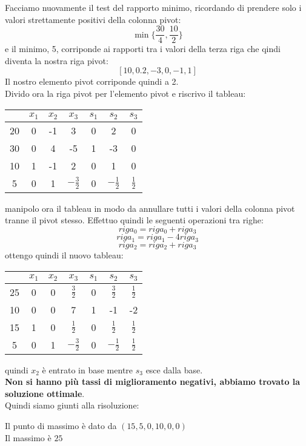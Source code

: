 \documentclass[a4paper,12pt, oneside]{book}
\begin{document}
Facciamo nuovamente il test del rapporto minimo, ricordando di
prendere solo i valori strettamente positivi della colonna pivot:
\[\min\Bigg\{\frac{30}{4}, \frac{10}{2}\Bigg\}\]
e il minimo, 5, corriponde ai rapporti tra i valori della terza riga
che qindi diventa la nostra riga pivot:
\[[10,0.2,-3,0,-1,1]\]
Il nostro elemento pivot corriponde quindi a 2.\\
Divido ora la riga pivot per l’elemento pivot e riscrivo il tableau:
\begin{center}
  \begin{tabular}{c|cccccc}
    & $x_1$ & $x_2$ & $x_3$ & $s_1$ & $s_2$ & $s_3$\\
    \hline
    20 & 0 & -1 & 3 & 0 & 2 & 0\\
    \hline
    30 & 0 & 4 & -5 & 1 & -3 & 0\\
    10 & 1 & -1 & 2 & 0 & 1 & 0\\
    5 & 0 & 1 & $-\frac{3}{2}$ & 0 & $-\frac{1}{2}$ & $\frac{1}{2}$
  \end{tabular}
\end{center}
manipolo ora il tableau in modo da annullare tutti i valori della colonna pivot
tranne il pivot stesso. Effettuo quindi le seguenti operazioni tra
righe:
\[riga_0=riga_0+riga_3\]
\[riga_1=riga_1-4riga_3\]
\[riga_2=riga_2+riga_3\]
ottengo quindi il nuovo tableau:
\begin{center}
  \begin{tabular}{c|cccccc}
    & $x_1$ & $x_2$ & $x_3$ & $s_1$ & $s_2$ & $s_3$\\
    \hline
    25 & 0 & 0 & $\frac{3}{2}$ & 0 & $\frac{3}{2}$ & $\frac{1}{2}$\\
    \hline
    10 & 0 & 0 & 7 & 1 & -1 & -2\\
    15 & 1 & 0 & $\frac{1}{2}$ & 0 & $\frac{1}{2}$ & $\frac{1}{2}$\\
    5 & 0 & 1 & $-\frac{3}{2}$ & 0 & $-\frac{1}{2}$ & $\frac{1}{2}$
  \end{tabular}
\end{center}
quindi $x_2$ è entrato in base mentre $s_3$ esce dalla base.\\
\textbf{Non si hanno più tassi di miglioramento negativi, abbiamo
  trovato la soluzione ottimale}.\\
Quindi siamo giunti alla risoluzione:
\begin{shaded}
  \noindent Il punto di massimo è dato da $(15,5,0,10,0,0)$\\
  Il massimo è $25$
\end{shaded}
\end{document}
